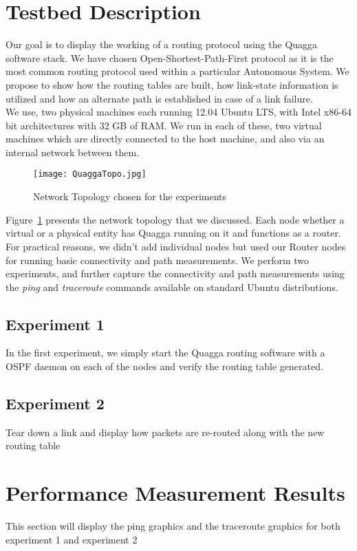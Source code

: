 \documentclass{article}
\begin{document}
\section{Testbed Description}
Our goal is to display the working of a routing protocol using the Quagga software stack.
We have chosen Open-Shortest-Path-First protocol as it is the most common routing protocol used
within a particular Autonomous System. We propose to show how the routing tables are built, 
how link-state information is utilized and how an alternate path is established in case of a link failure.\\
We use, two physical machines each running 12.04 Ubuntu LTS, with Intel x86-64 bit architectures with
32 GB of RAM. We run in each of these, two virtual machines which are directly connected to the host machine,
and also via an internal network between them.\\
\begin{figure}[ht!]
  \centering
  \texttt{[image: QuaggaTopo.jpg]}
  \caption{Network Topology chosen for the experiments}
  \label{fig:networktopo}
\end{figure}
Figure~\ref{fig:networktopo} presents the network topology that we discussed. Each node whether a virtual or a physical
entity has Quagga running on it and functions as a router. For practical reasons, we didn't add individual nodes
but used our Router nodes for running basic connectivity and path measurements. We perform two experiments, and
further capture the connectivity and path measurements using the \textit{ping} and \textit{traceroute} commands 
available on standard Ubuntu distributions.
\subsection{Experiment 1}
In the first experiment, we simply start the Quagga routing software with a OSPF daemon on each of the nodes
and verify the routing table generated.
\subsection{Experiment 2}
Tear down a link and display how packets are re-routed along with the new routing table
\clearpage
\section{Performance Measurement Results}
This section will display the ping graphics and the traceroute graphics for both experiment 1 and experiment 2
\end{document}
